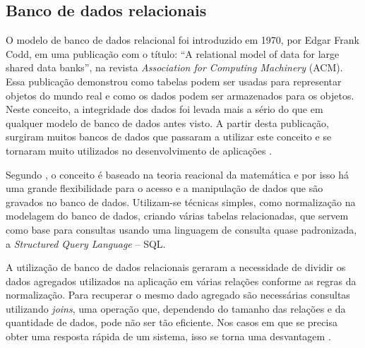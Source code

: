 \subsection{Banco de dados relacionais}

\par O modelo de banco de dados relacional foi introduzido em 1970, por Edgar Frank Codd, em uma publicação com o título: “A relational model of data for large shared data banks”, na revista \textit{Association for Computing Machinery} (ACM). Essa publicação demonstrou como tabelas podem ser usadas para representar objetos do mundo real e como os dados podem ser armazenados para os objetos. Neste conceito, a integridade dos dados foi levada mais a sério do que em qualquer modelo de banco de dados antes visto. A partir desta publicação, surgiram muitos bancos de dados que passaram a utilizar este conceito e se tornaram muito utilizados no desenvolvimento de aplicações
\cite{matthew_stones_beginning_databases_with_postgresql}.

\par Segundo , o conceito é baseado na teoria reacional da matemática e por isso há uma grande flexibilidade para o acesso e a manipulação de dados que são gravados no banco de dados. Utilizam-se técnicas simples, como normalização na modelagem do banco de dados, criando várias tabelas relacionadas, que servem como base para consultas usando uma linguagem de consulta quase padronizada, a \textit{Structured Query Language} – SQL\footnotemark[5].



\par A utilização de banco de dados relacionais geraram a necessidade de dividir os dados agregados utilizados na aplicação em várias relações conforme as regras da normalização. Para recuperar o mesmo dado agregado são necessárias consultas utilizando \textit{joins}\footnotemark[6], uma operação que, dependendo do tamanho das relações e da quantidade de dados, pode não ser tão eficiente. Nos casos em que se precisa obter uma resposta rápida de um sistema, isso se torna uma desvantagem \cite{sadalage_fowler_nosql_distilled_brief_guide}.

